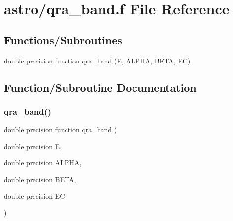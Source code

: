 \hypertarget{qra__band_8f}{}\section{astro/qra\+\_\+band.f File Reference}
\label{qra__band_8f}
\subsection*{Functions/\+Subroutines}
\begin{DoxyCompactItemize}
\item 
double precision function \hyperlink{qra__band_8f_a6c8dbebf661646e62388a11985db157a}{qra\+\_\+band} (E, A\+L\+P\+HA, B\+E\+TA, EC)
\end{DoxyCompactItemize}


\subsection{Function/\+Subroutine Documentation}
\mbox{\label{qra__band_8f_a6c8dbebf661646e62388a11985db157a}} 
\subsubsection{\texorpdfstring{qra\+\_\+band()}{qra\_band()}}
{\footnotesize\ttfamily double precision function qra\+\_\+band (\begin{DoxyParamCaption}\item[{double precision}]{E,  }\item[{double precision}]{A\+L\+P\+HA,  }\item[{double precision}]{B\+E\+TA,  }\item[{double precision}]{EC }\end{DoxyParamCaption})}


